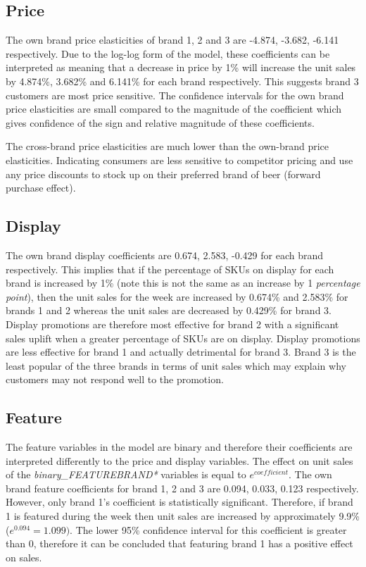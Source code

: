 \documentclass[a4paper,11pt]{article}
\begin{document}
\subsection{Price}

The own brand price elasticities of brand 1, 2 and 3 are -4.874, -3.682, -6.141 respectively. Due to the log-log form of the model, these coefficients can be interpreted as meaning that a decrease in price by 1\% will increase the unit sales by 4.874\%, 3.682\% and 6.141\% for each brand respectively. This suggests brand 3 customers are most price sensitive. The confidence intervals for the own brand price elasticities are small compared to the magnitude of the coefficient which gives confidence of the sign and relative magnitude of these coefficients.

The cross-brand price elasticities are much lower than the own-brand price elasticities. Indicating consumers are less sensitive to competitor pricing and use any price discounts to stock up on their preferred brand of beer (forward purchase effect).


\subsection{Display}

The own brand display coefficients are 0.674, 2.583, -0.429 for each brand respectively. This implies that if the percentage of SKUs on display for each brand is increased by 1\% (note this is not the same as an increase by 1 \textit{percentage point}), then the unit sales for the week are increased by 0.674\% and 2.583\% for brands 1 and 2 whereas the unit sales are decreased by 0.429\% for brand 3. Display promotions are therefore most effective for brand 2 with a significant sales uplift when a greater percentage of SKUs are on display. Display promotions are less effective for brand 1 and actually detrimental for brand 3. Brand 3 is the least popular of the three brands in terms of unit sales which may explain why customers may not respond well to the promotion.

\subsection{Feature}

The feature variables in the model are binary and therefore their coefficients are interpreted differently to the price and display variables. The effect on unit sales of the \textit{binary\_FEATUREBRAND*} variables is equal to $e^{coefficient}$. The own brand feature coefficients for brand 1, 2 and 3 are 0.094, 0.033, 0.123 respectively. However, only brand 1's coefficient is statistically significant. Therefore, if brand 1 is featured during the week then unit sales are increased by approximately 9.9\% ($e^{0.094} = 1.099)$. The lower 95\% confidence interval for this coefficient is greater than 0, therefore it can be concluded that featuring brand 1 has a positive effect on sales.
\end{document}
